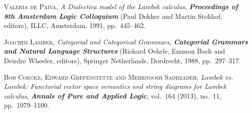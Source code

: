 \documentclass[bsl,meeting]{asl}
\begin{document}
\begin{thebibliography}{10}



{\scshape Valeria de Paiva},
{\itshape A {D}ialectica model of the {L}ambek calculus},
{\bfseries\itshape Proceedings of 8th Amsterdam Logic Colloquium}
(Paul Dekker and Martin Stokhof, editors),
ILLC, Amsterdam,
1991,
pp.~445--462.

{\scshape Joachim Lambek},
{\itshape Categorial and Categorical Grammars},
{\bfseries\itshape Categorial Grammars and Natural Language Structures}
(Richard Oehrle,  Emmon Bach and Deirdre Wheeler, editors),
Springer Netherlands,
Dordrecht,
1988, pp.~297--317.


{\scshape Bob Coecke, Edward Grefenstette  and Mehrnoosh Sadrzadeh},
{\itshape Lambek vs. Lambek: Functorial vector space semantics and string diagrams for {L}ambek calculus},
{\bfseries\itshape Annals of Pure and Applied Logic},
vol.~164 (2013), no.~11, pp.~1079--1100.	
	


\end{thebibliography}


\vspace*{-0.5\baselineskip}
\end{document}
